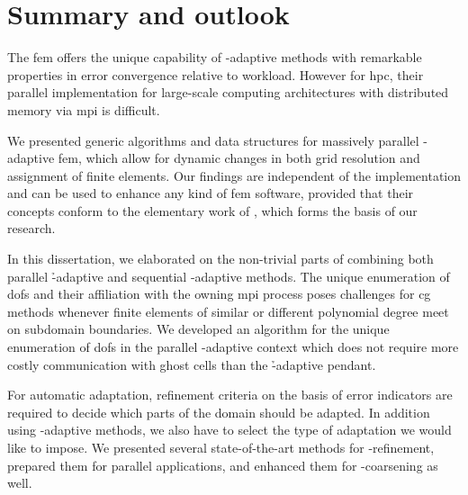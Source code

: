 \chapter{Summary and outlook}
\label{ch:summary}
\glsresetall


The \gls{fem} offers the unique capability of \hp-adaptive methods with remarkable properties in error convergence relative to workload. However for \gls{hpc}, their parallel implementation for large-scale computing architectures with distributed memory via \gls{mpi} is difficult.

We presented generic algorithms and data structures for massively parallel \hp-adaptive \gls{fem}, which allow for dynamic changes in both grid resolution and assignment of finite elements. Our findings are independent of the implementation and can be used to enhance any kind of \gls{fem} software, provided that their concepts conform to the elementary work of \textcite{bangerth2009,bangerth2012}, which forms the basis of our research.




In this dissertation, we elaborated on the non-trivial parts of combining both parallel \h-adaptive and sequential \hp-adaptive methods.
The unique enumeration of \glspl{dof} and their affiliation with the owning \gls{mpi} process poses challenges for \gls{cg} methods whenever finite elements of similar or different polynomial degree meet on subdomain boundaries. We developed an algorithm for the unique enumeration of \glspl{dof} in the parallel \hp-adaptive context which does not require more costly communication with ghost cells than the \h-adaptive pendant.

For automatic adaptation, refinement criteria on the basis of error indicators are required to decide which parts of the domain should be adapted. In addition using \hp-adaptive methods, we also have to select the type of adaptation we would like to impose.
We presented several state-of-the-art methods for \hp-refinement, prepared them for parallel applications, and enhanced them for \hp-coarsening as well.

